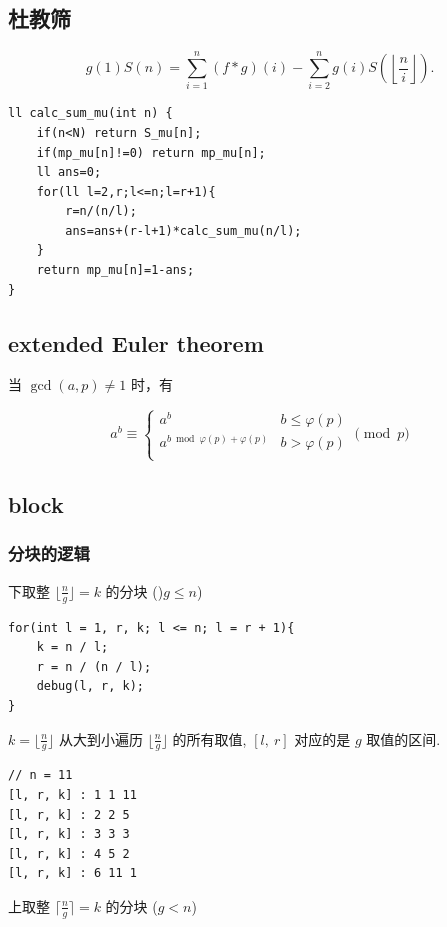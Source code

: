 \documentclass[UTF8, a4paper, titlepage, twoside]{ctexart}
\begin{document}
\subsection{ 杜教筛 }
$$
g(1)S(n)=\sum\limits_{i=1}^n(f*g)(i)-\sum_{i=2}^ng(i)S\left(\left\lfloor\dfrac ni\right\rfloor\right).
$$
\begin{lstlisting}[style=cpp]
ll calc_sum_mu(int n) {
    if(n<N) return S_mu[n];
    if(mp_mu[n]!=0) return mp_mu[n];
    ll ans=0;
    for(ll l=2,r;l<=n;l=r+1){
        r=n/(n/l);
        ans=ans+(r-l+1)*calc_sum_mu(n/l);
    }
    return mp_mu[n]=1-ans;
}
\end{lstlisting}

\subsection{ extended Euler theorem }
当 $\gcd(a,p)\neq 1$ 时，有

$$
a^b\equiv \begin{cases}
  a^b & b \le \varphi(p)\\
  a^{b\bmod \varphi(p)+\varphi(p)} & b > \varphi(p)\\
\end{cases}
\pmod p
$$

\subsection{ block }

\subsubsection*{ 分块的逻辑 }

下取整 $\lfloor \frac{n}{g} \rfloor = k$ 的分块 ()$g \leqslant n$)

\begin{lstlisting}[style=cpp]
for(int l = 1, r, k; l <= n; l = r + 1){
    k = n / l;
    r = n / (n / l);
    debug(l, r, k);
}
\end{lstlisting}

$k = \lfloor \frac{n}{g} \rfloor$ 从大到小遍历 $\lfloor \frac{n}{g} \rfloor$ 的所有取值, $[l, \ r]$ 对应的是 $g$ 取值的区间.

\begin{lstlisting}[style=cpp]
// n = 11
[l, r, k] : 1 1 11 
[l, r, k] : 2 2 5 
[l, r, k] : 3 3 3 
[l, r, k] : 4 5 2 
[l, r, k] : 6 11 1 
\end{lstlisting}

上取整 $\lceil \frac{n}{g} \rceil = k$ 的分块 ($g < n$)
\end{document}
